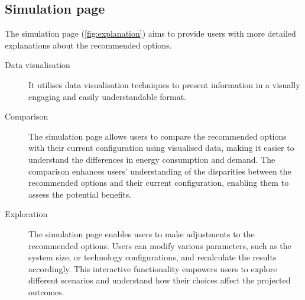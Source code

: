 \subsection*{Simulation page}

The simulation page (\ref{fig:explanation}) aims to provide users with more detailed explanations about the recommended options.
\begin{description}
  \item[Data visualisation] It utilises data visualisation techniques to present information in a visually engaging and easily understandable format.
  \item[Comparison] The simulation page allows users to compare the recommended options with their current configuration using visualised data, making it easier to understand the differences in energy consumption and demand. 
    The comparison enhances users' understanding of the disparities between the recommended options and their current configuration, enabling them to assess the potential benefits. 
  \item[Exploration] The simulation page enables users to make adjustments to the recommended options. 
    Users can modify various parameters, such as the system size, or technology configurations, and recalculate the results accordingly. 
    This interactive functionality empowers users to explore different scenarios and understand how their choices affect the projected outcomes. 
\end{description}
